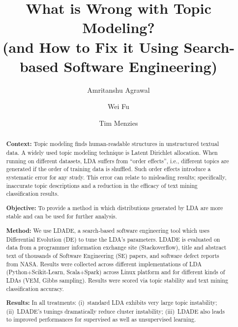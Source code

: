\documentclass[twocolumn,5p,sort&compress]{elsarticle}
\theoremstyle{break}
\begin{document}
\begin{frontmatter}

\title{What is  Wrong with
Topic Modeling?\\ (and How to Fix it Using Search-based Software Engineering)}



\author{Amritanshu Agrawal}



\author{Wei Fu}

\author{Tim Menzies}
\address{Department of Computer Science, North Carolina State University, Raleigh, NC, USA}

\begin{abstract}

\noindent \textbf{Context:} Topic modeling finds
  human-readable structures in unstructured textual data. A
  widely used topic modeling technique is Latent Dirichlet allocation. When
  running on different datasets, LDA suffers from ``order effects'', i.e., different topics are generated if the order of training data is shuffled.
  Such order effects introduce a
 systematic error for any study. This error can relate to misleading results;
  specifically, inaccurate topic descriptions and a reduction in the efficacy of
  text mining classification results.

 \noindent
\textbf{Objective:} To provide a method in which distributions
generated by LDA are more stable and can be used for further analysis.

 \noindent
\textbf{Method:} We use LDADE, a search-based software engineering tool which uses Differential Evolution (DE) to tune the LDA's parameters.
LDADE is evaluated on data from a programmer
information exchange site (Stackoverflow), title and abstract text of thousands
of Software Engineering (SE) papers, and software defect reports from NASA. Results were collected
across different implementations of LDA (Python+Scikit-Learn, Scala+Spark) across
Linux platform and for different kinds of LDAs (VEM, Gibbs sampling). 
Results were scored via topic stability and text mining classification accuracy.

\noindent
\textbf{Results:}
In all treatments:
   (i)~standard LDA exhibits very large topic instability;
  (ii)~LDADE's tunings dramatically reduce cluster instability; 
  (iii)~LDADE also leads to  improved performances for supervised as well as unsupervised learning.


\end{abstract}
\end{frontmatter}
\end{document}
